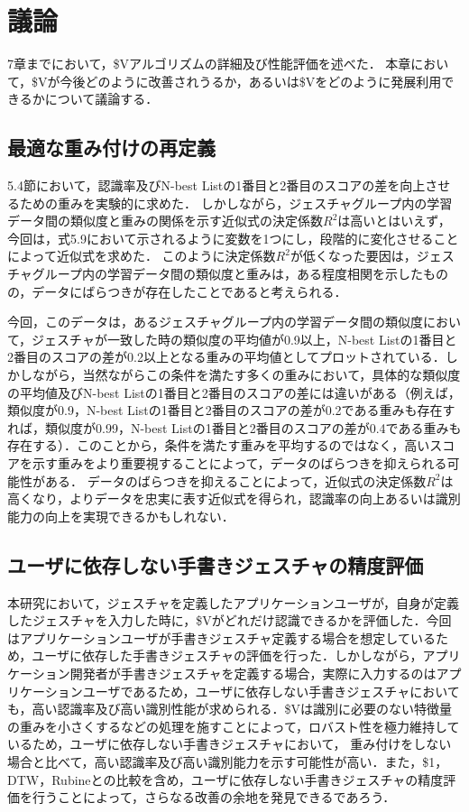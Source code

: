 \chapter{議論}
7章までにおいて，\$Vアルゴリズムの詳細及び性能評価を述べた．
本章において，\$Vが今後どのように改善されうるか，あるいは\$Vをどのように発展利用できるかについて議論する．

\section{最適な重み付けの再定義}
5.4節において，認識率及びN-best Listの1番目と2番目のスコアの差を向上させるための重みを実験的に求めた．
しかしながら，ジェスチャグループ内の学習データ間の類似度と重みの関係を示す近似式の決定係数$R^2$は高いとはいえず，今回は，式5.9において示されるように変数を1つにし，段階的に変化させることによって近似式を求めた．
このように決定係数$R^2$が低くなった要因は，ジェスチャグループ内の学習データ間の類似度と重みは，ある程度相関を示したものの，データにばらつきが存在したことであると考えられる．

今回，このデータは，あるジェスチャグループ内の学習データ間の類似度において，ジェスチャが一致した時の類似度の平均値が0.9以上，N-best Listの1番目と2番目のスコアの差が0.2以上となる重みの平均値としてプロットされている．しかしながら，当然ながらこの条件を満たす多くの重みにおいて，具体的な類似度の平均値及びN-best Listの1番目と2番目のスコアの差には違いがある（例えば，類似度が0.9，N-best Listの1番目と2番目のスコアの差が0.2である重みも存在すれば，類似度が0.99，N-best Listの1番目と2番目のスコアの差が0.4である重みも存在する）．このことから，条件を満たす重みを平均するのではなく，高いスコアを示す重みをより重要視することによって，データのばらつきを抑えられる可能性がある．
データのばらつきを抑えることによって，近似式の決定係数$R^2$は高くなり，よりデータを忠実に表す近似式を得られ，認識率の向上あるいは識別能力の向上を実現できるかもしれない．


\section{ユーザに依存しない手書きジェスチャの精度評価}
本研究において，ジェスチャを定義したアプリケーションユーザが，自身が定義したジェスチャを入力した時に，\$Vがどれだけ認識できるかを評価した．今回はアプリケーションユーザが手書きジェスチャ定義する場合を想定しているため，ユーザに依存した手書きジェスチャの評価を行った．しかしながら，アプリケーション開発者が手書きジェスチャを定義する場合，実際に入力するのはアプリケーションユーザであるため，ユーザに依存しない手書きジェスチャにおいても，高い認識率及び高い識別性能が求められる．\$Vは識別に必要のない特徴量の重みを小さくするなどの処理を施すことによって，ロバスト性を極力維持しているため，ユーザに依存しない手書きジェスチャにおいて，
重み付けをしない場合と比べて，高い認識率及び高い識別能力を示す可能性が高い．また，\$1，DTW，Rubineとの比較を含め，ユーザに依存しない手書きジェスチャの精度評価を行うことによって，さらなる改善の余地を発見できるであろう．


